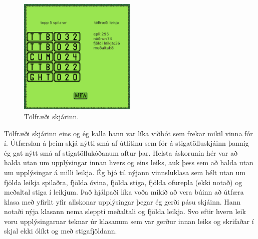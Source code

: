 \documentclass[a4paper]{paper}
\begin{document}
\begin{figure}
    \vspace{-\baselineskip}
    \centering
    \includegraphics[width=0.5\textwidth]{imgs/stats.png}
    \caption{\label{fig:stats}Tölfræði skjárinn.}
\end{figure}%
Tölfræði skjárinn eins og ég kalla hann var líka viðbót sem frekar mikil vinna fór í.
Útfærslan á þeim skjá nýtti smá af útlitinu sem fór á stigatöfluskjáinn þannig ég gat nýtt smá af stigatöflukóðanum aftur þar.
Helsta áskorunin hér var að halda utan um upplýsingar innan hvers og eins leiks, 
auk þess sem að halda utan um upplýsingar á milli leikja.
Ég bjó til nýjann vinnsluklasa sem hélt utan um fjölda leikja spilaðra, fjölda óvina, fjölda stiga, fjölda ofurepla (ekki notað) og meðaltal stiga í leikjum.
Það hjálpaði líka voða mikið að vera búinn að útfæra klasa með yfirlit yfir allskonar upplýsingar þegar ég gerði pásu skjáinn.
Hann notaði nýja klasann nema sleppti meðaltali og fjölda leikja.
Svo eftir hvern leik voru upplýsingarnar teknar úr klasanum sem var gerður innan leiks og skrifaðar í skjal ekki ólíkt og með stigafjöldann.
\end{document}
